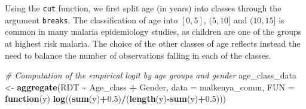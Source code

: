 \documentclass[
  letterpaper,
]{krantz}
\newenvironment{Shaded}{\begin{snugshade}}{\end{snugshade}}
\newcommand{\AttributeTok}[1]{\textcolor[rgb]{0.13,0.29,0.53}{#1}}
\newcommand{\CommentTok}[1]{\textcolor[rgb]{0.56,0.35,0.01}{\textit{#1}}}
\newcommand{\ConstantTok}[1]{\textcolor[rgb]{0.56,0.35,0.01}{#1}}
\newcommand{\ControlFlowTok}[1]{\textcolor[rgb]{0.13,0.29,0.53}{\textbf{#1}}}
\newcommand{\DecValTok}[1]{\textcolor[rgb]{0.00,0.00,0.81}{#1}}
\newcommand{\FloatTok}[1]{\textcolor[rgb]{0.00,0.00,0.81}{#1}}
\newcommand{\FunctionTok}[1]{\textcolor[rgb]{0.13,0.29,0.53}{\textbf{#1}}}
\newcommand{\NormalTok}[1]{#1}
\newcommand{\OtherTok}[1]{\textcolor[rgb]{0.56,0.35,0.01}{#1}}
\newcommand{\SpecialCharTok}[1]{\textcolor[rgb]{0.81,0.36,0.00}{\textbf{#1}}}
\begin{document}
\begin{Shaded}
\end{Shaded}

Using the \texttt{cut} function, we first split age (in years) into
classes through the argument \texttt{breaks}. The classification of age
into \([0,5]\), \((5, 10]\) and \((10, 15]\) is common in many malaria
epidemiology studies, as children are one of the groups at highest risk
malaria. The choice of the other classes of age reflects instead the
need to balance the number of observations falling in each of the
classes.

\begin{Shaded}
\begin{Highlighting}[]
\CommentTok{\# Computation of the empirical logit by age groups and gender}
\NormalTok{age\_class\_data }\OtherTok{\textless{}{-}} \FunctionTok{aggregate}\NormalTok{(RDT }\SpecialCharTok{\textasciitilde{}}\NormalTok{ Age\_class }\SpecialCharTok{+}\NormalTok{ Gender, }
                                    \AttributeTok{data =}\NormalTok{ malkenya\_comm, }
                                    \AttributeTok{FUN =} \ControlFlowTok{function}\NormalTok{(y) }
                                    \FunctionTok{log}\NormalTok{((}\FunctionTok{sum}\NormalTok{(y)}\SpecialCharTok{+}\FloatTok{0.5}\NormalTok{)}\SpecialCharTok{/}\NormalTok{(}\FunctionTok{length}\NormalTok{(y)}\SpecialCharTok{{-}}\FunctionTok{sum}\NormalTok{(y)}\SpecialCharTok{+}\FloatTok{0.5}\NormalTok{)))}
\end{Highlighting}
\end{Shaded}
\end{document}
